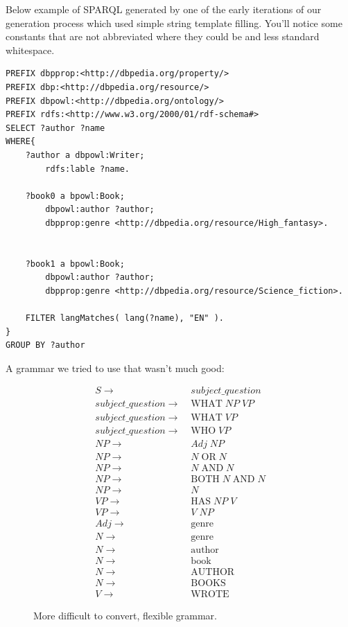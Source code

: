 \documentclass[11pt]{article}
\begin{document}
Below example of SPARQL generated by one of the early iterations of our generation process
which used simple string template filling. You'll notice some constants that are
not abbreviated where they could be and less standard whitespace.

\begin{verbatim}
PREFIX dbpprop:<http://dbpedia.org/property/>
PREFIX dbp:<http://dbpedia.org/resource/>
PREFIX dbpowl:<http://dbpedia.org/ontology/>
PREFIX rdfs:<http://www.w3.org/2000/01/rdf-schema#>
SELECT ?author ?name
WHERE{
    ?author a dbpowl:Writer;
        rdfs:lable ?name.

    ?book0 a bpowl:Book;
        dbpowl:author ?author;
        dbpprop:genre <http://dbpedia.org/resource/High_fantasy>.


    ?book1 a bpowl:Book;
        dbpowl:author ?author;
        dbpprop:genre <http://dbpedia.org/resource/Science_fiction>.

    FILTER langMatches( lang(?name), "EN" ).
}
GROUP BY ?author
\end{verbatim}


A grammar we tried to use that wasn't much good:
\begin{figure}[h!]
\setcounter{equation}{0}
\begin{align}
S \rightarrow\; & subject\_question \\
subject\_question \rightarrow\; & \text{WHAT} \; NP \; VP \\
subject\_question \rightarrow\; & \text{WHAT} \; VP \\
subject\_question \rightarrow\; & \text{WHO} \; VP \\
NP \rightarrow\; & Adj \; NP \\
NP \rightarrow\; & N \; \text{OR} \; N \\
NP \rightarrow\; & N \; \text{AND} \; N \\
NP \rightarrow\; & \text{BOTH} \; N \; \text{AND} \; N \\
NP \rightarrow\; & N\\
VP \rightarrow\; & \text{HAS} \; NP \; V \\
VP \rightarrow\; & V \; NP \\
Adj \rightarrow\; & \text{genre} \\
N \rightarrow\; & \text{genre} \\
N \rightarrow\; & \text{author} \\
N \rightarrow\; & \text{book} \\
N \rightarrow\; & \text{AUTHOR} \\
N \rightarrow\; & \text{BOOKS} \\
V \rightarrow\; & \text{WROTE}
\end{align}

\caption{More difficult to convert, flexible grammar.}
\label{fig:slow_grammar}
\end{figure}


{}

\end{document}
